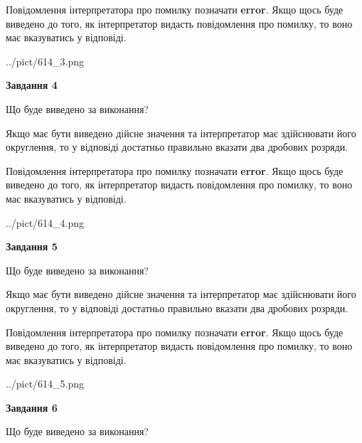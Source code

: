 \documentclass[12pt, ukrainian]{article}
\begin{document}
{\begin {Large}
Повідомлення інтерпретатора про помилку позначати \textbf{error}.
Якщо щось буде виведено до того, як інтерпретатор видасть повідомлення про помилку, 
то воно має вказуватись у відповіді. \par

\begin{center}
	{../pict/614_3.png}
\end{center}
\newpage

{\begin {center}\textbf{Завдання 4}\end {center}}\par
Що буде виведено за виконання? \par

Якщо має бути виведено дійсне значення та інтерпретатор має здійснювати його округлення, 
то у відповіді достатньо правильно вказати два дробових розряди.

Повідомлення інтерпретатора про помилку позначати \textbf{error}.
Якщо щось буде виведено до того, як інтерпретатор видасть повідомлення про помилку, 
то воно має вказуватись у відповіді. \par

\begin{center}
	{../pict/614_4.png}
\end{center}
\newpage

{\begin {center}\textbf{Завдання 5}\end {center}}\par
Що буде виведено за виконання? \par

Якщо має бути виведено дійсне значення та інтерпретатор має здійснювати його округлення, 
то у відповіді достатньо правильно вказати два дробових розряди.

Повідомлення інтерпретатора про помилку позначати \textbf{error}.
Якщо щось буде виведено до того, як інтерпретатор видасть повідомлення про помилку, 
то воно має вказуватись у відповіді. \par

\begin{center}
	{../pict/614_5.png}
\end{center}
\newpage

{\begin {center}\textbf{Завдання 6}\end {center}}\par
Що буде виведено за виконання? \par


\end{Large}}
\end{document}
